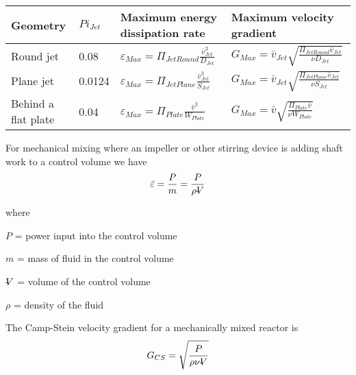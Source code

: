 \documentclass[letterpaper,10pt,english]{sphinxmanual}
\begin{document}
\begin{savenotes}\sphinxattablestart
\raggedright
{}
\label{\detokenize{Rapid_Mix/RM_Intro:id17}}\label{\detokenize{Rapid_Mix/RM_Intro:table-edr-g-equations}}
\sphinxaftercaption
\begin{tabulary}{\linewidth}[t]{|T|T|T|T|}
\hline
\sphinxstyletheadfamily 
Geometry
&
\(Pi_{Jet}\)
&\sphinxstyletheadfamily 
Maximum energy dissipation rate
&\sphinxstyletheadfamily 
Maximum velocity gradient
\\
\hline
Round jet
&
0.08
&
\(\varepsilon_{Max} = \Pi_{JetRound}\frac{   \bar v_{Jet} ^3}{D_{Jet}}\)
&
\(G_{Max} = \bar v_{Jet} \sqrt{\frac{\Pi_{JetRound} \bar v_{Jet} }{\nu D_{Jet}}}\)
\\
\hline
Plane jet
&
0.0124
&
\(\varepsilon_{Max} = \Pi_{JetPlane} \frac{  \bar v_{Jet} ^3}{S_{Jet}}\)
&
\(G_{Max} = \bar v_{Jet}\sqrt{\frac{\Pi_{JetPlane} \bar v_{Jet}}{\nu S_{Jet}}}\)
\\
\hline
Behind a flat plate
&
0.04
&
\(\varepsilon _{Max} = \Pi_{Plate}\frac{\bar v^3}{W_{Plate}}\)
&
\(G_{Max} = \bar v\sqrt{\frac{\Pi_{Plate} \bar v}{\nu W_{Plate}}}\)
\\
\hline
\end{tabulary}
\par
\sphinxattableend\end{savenotes}

For mechanical mixing where an impeller or other stirring device is adding shaft work to a control volume we have
\begin{equation}\label{equation:Rapid_Mix/RM_Intro:Rapid_Mix/RM_Intro:14}
\begin{split}\bar\varepsilon = \frac{P}{m} = \frac{P}{\rho \rlap{-}V}\end{split}
\end{equation}
\begin{DUlineblock}{0em}
\item[] where
\item[] \(P\) = power input into the control volume
\item[] \(m\) = mass of fluid in the control volume
\item[] \(\rlap{-}V\) = volume of the control volume
\item[] \(\rho\) = density of the fluid
\end{DUlineblock}

The Camp-Stein velocity gradient for a mechanically mixed reactor is
\begin{equation}\label{equation:Rapid_Mix/RM_Intro:Rapid_Mix/RM_Intro:15}
\begin{split}G_{CS} = \sqrt{\frac{P}{\rho \nu \rlap{-}V}}\end{split}
\end{equation}
\end{document}
